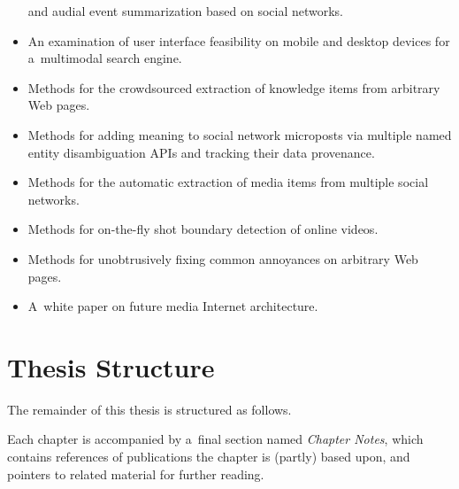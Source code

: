\begin{itemize}
        and audial event summarization based on social networks.
  \item An examination of user interface feasibility on
        mobile and desktop devices for a~multimodal search engine.
  \item Methods for the crowdsourced extraction of knowledge items
        from arbitrary Web pages.
  \item Methods for adding meaning to social network microposts
        via multiple named entity disambiguation APIs and
        tracking their data provenance.
  \item Methods for the automatic extraction of media items from
        multiple social networks.
  \item Methods for on-the-fly shot boundary detection of
        online videos.
   \item Methods for unobtrusively fixing common annoyances on
         arbitrary Web pages.
   \item A~white paper on future media Internet architecture.
\end{itemize}

\section{Thesis Structure}

The remainder of this thesis is structured as follows. 

Each chapter is accompanied by a~final section named
\emph{Chapter Notes}, which contains references of publications
the chapter is (partly) based upon,
and pointers to related material for further reading.